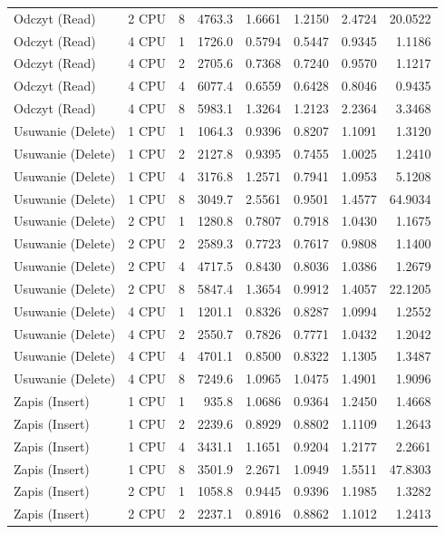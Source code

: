 \begin{table}[ht]
{\begin{tabular}{llcrrrrr}
Odczyt (Read) & 2 CPU & 8 & 4763.3 & 1.6661 & 1.2150 & 2.4724 & 20.0522 \\
Odczyt (Read) & 4 CPU & 1 & 1726.0 & 0.5794 & 0.5447 & 0.9345 & 1.1186 \\
Odczyt (Read) & 4 CPU & 2 & 2705.6 & 0.7368 & 0.7240 & 0.9570 & 1.1217 \\
Odczyt (Read) & 4 CPU & 4 & 6077.4 & 0.6559 & 0.6428 & 0.8046 & 0.9435 \\
Odczyt (Read) & 4 CPU & 8 & 5983.1 & 1.3264 & 1.2123 & 2.2364 & 3.3468 \\
Usuwanie (Delete) & 1 CPU & 1 & 1064.3 & 0.9396 & 0.8207 & 1.1091 & 1.3120 \\
Usuwanie (Delete) & 1 CPU & 2 & 2127.8 & 0.9395 & 0.7455 & 1.0025 & 1.2410 \\
Usuwanie (Delete) & 1 CPU & 4 & 3176.8 & 1.2571 & 0.7941 & 1.0953 & 5.1208 \\
Usuwanie (Delete) & 1 CPU & 8 & 3049.7 & 2.5561 & 0.9501 & 1.4577 & 64.9034 \\
Usuwanie (Delete) & 2 CPU & 1 & 1280.8 & 0.7807 & 0.7918 & 1.0430 & 1.1675 \\
Usuwanie (Delete) & 2 CPU & 2 & 2589.3 & 0.7723 & 0.7617 & 0.9808 & 1.1400 \\
Usuwanie (Delete) & 2 CPU & 4 & 4717.5 & 0.8430 & 0.8036 & 1.0386 & 1.2679 \\
Usuwanie (Delete) & 2 CPU & 8 & 5847.4 & 1.3654 & 0.9912 & 1.4057 & 22.1205 \\
Usuwanie (Delete) & 4 CPU & 1 & 1201.1 & 0.8326 & 0.8287 & 1.0994 & 1.2552 \\
Usuwanie (Delete) & 4 CPU & 2 & 2550.7 & 0.7826 & 0.7771 & 1.0432 & 1.2042 \\
Usuwanie (Delete) & 4 CPU & 4 & 4701.1 & 0.8500 & 0.8322 & 1.1305 & 1.3487 \\
Usuwanie (Delete) & 4 CPU & 8 & 7249.6 & 1.0965 & 1.0475 & 1.4901 & 1.9096 \\
Zapis (Insert) & 1 CPU & 1 & 935.8 & 1.0686 & 0.9364 & 1.2450 & 1.4668 \\
Zapis (Insert) & 1 CPU & 2 & 2239.6 & 0.8929 & 0.8802 & 1.1109 & 1.2643 \\
Zapis (Insert) & 1 CPU & 4 & 3431.1 & 1.1651 & 0.9204 & 1.2177 & 2.2661 \\
Zapis (Insert) & 1 CPU & 8 & 3501.9 & 2.2671 & 1.0949 & 1.5511 & 47.8303 \\
Zapis (Insert) & 2 CPU & 1 & 1058.8 & 0.9445 & 0.9396 & 1.1985 & 1.3282 \\
Zapis (Insert) & 2 CPU & 2 & 2237.1 & 0.8916 & 0.8862 & 1.1012 & 1.2413 \\

\end{tabular}}
\end{table}
